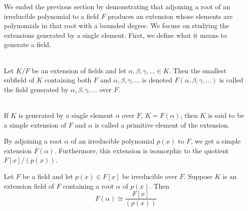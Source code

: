 We ended the previous section by demonstrating that adjoining a root of an irreducible polynomial to a field $F$ produces an extension whose elements are polynomials in that root with a bounded degree. We focuse on studying the extensions generated by a single element. First, we define what it means to generate a field.

\begin{definition} \leavevmode \\
    Let $K/F$ be an extension of fields and let $\alpha, \beta, \gamma, ... \in K$. Then the smallest subfield of $K$ containing both $F$ and $\alpha, \beta, \gamma, ...$ is denoted $F(\alpha, \beta, \gamma, ...)$ is called the field generated by $\alpha, \beta, \gamma, ...$ over $F$.
\end{definition}

\begin{definition} \leavevmode \\
    If $K$ is generated by a single element $\alpha$ over $F$, $K = F(\alpha)$, then $K$ is said to be a simple extension of $F$ and $\alpha$ is called a primitive element of the extension.
\end{definition}

By adjoining a root $\alpha$ of an irreducible polynomial $p(x)$ to $F$, we get a simple extension $F(\alpha)$. Furthermore, this extension is isomorphic to the quotient $F[x]/(p(x))$.

\begin{theorem}
    Let $F$ be a field and let $p(x) \in F[x]$ be irreducible over $F$. Suppose $K$ is an extension field of $F$ containing a root $\alpha$ of $p(x)$. Then
    $$F(\alpha) \cong \frac{F[x]}{\left(p(x)\right)}$$
\end{theorem}

